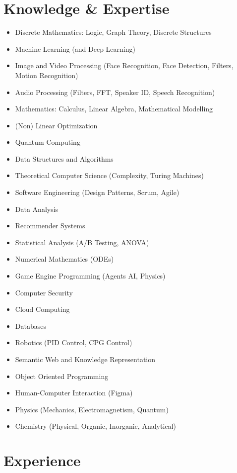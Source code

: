 \documentclass[a4paper,10pt]{article}
\begin{document}
\section*{Knowledge \& Expertise}
\begin{itemize}
    \item Discrete Mathematics: Logic, Graph Theory, Discrete Structures
    \item Machine Learning (and Deep Learning)
    \item Image and Video Processing (Face Recognition, Face Detection, Filters, Motion Recognition)
    \item Audio Processing (Filters, FFT, Speaker ID, Speech Recognition)
    \item Mathematics: Calculus, Linear Algebra, Mathematical Modelling
    \item (Non) Linear Optimization
    \item Quantum Computing
    \item Data Structures and Algorithms
    \item Theoretical Computer Science (Complexity, Turing Machines)
    \item Software Engineering (Design Patterns, Scrum, Agile)
    \item Data Analysis
    \item Recommender Systems
    \item Statistical Analysis (A/B Testing, ANOVA)
    \item Numerical Mathematics (ODEs)
    \item Game Engine Programming (Agents AI, Physics)
    \item Computer Security
    \item Cloud Computing
    \item Databases
    \item Robotics (PID Control, CPG Control)
    \item Semantic Web and Knowledge Representation
    \item Object Oriented Programming
    \item Human-Computer Interaction (Figma)
    \item Physics (Mechanics, Electromagnetism, Quantum)
    \item Chemistry (Physical, Organic, Inorganic, Analytical)
\end{itemize}

\section*{Experience}
\end{document}
